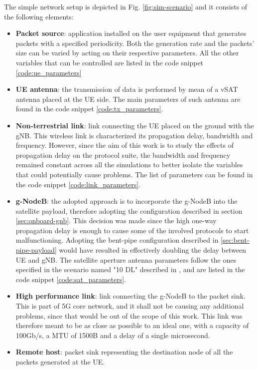 The simple network setup is depicted in Fig. \ref{fig:sim-scenario} and it consists of the following elements:
\begin{itemize}
    \item \textbf{Packet source}: application installed on the user equipment that generates packets with a specified periodicity. Both the generation rate and the packets' size can be varied by acting on their respective parameters. All the other variables that can be controlled are listed in the code snippet \ref{code:ue_parameters}
    \item \textbf{UE antenna}: the transmission of data is performed by mean of a \ac{vSAT} antenna placed at the \ac{UE} side. The main parameters of such antenna are found in the code snippet \ref{code:tx_parameters}.
    \item \textbf{Non-terrestrial link}: link connecting the \ac{UE} placed on the ground with the \ac{gNB}. This wireless link is characterized its propagation delay, bandwidth and frequency. However, since the aim of this work is to study the effects of propagation delay on the protocol suite, the bandwidth and frequency remained constant across all the simulations to better isolate the variables that could potentially cause problems. The list of parameters can be found in the code snippet \ref{code:link_parameters}.
    \item \textbf{g-NodeB}: the adopted approach is to incorporate the g-NodeB into the satellite payload, therefore adopting the configuration described in section \ref{sec:onboard-gnb}. This decision was made since the high one-way propagation delay is enough to cause some of the involved protocols to start malfunctioning. Adopting the bent-pipe configuration described in \ref{sec:bent-pipe-payload} would have resulted in effectively doubling the delay between \ac{UE} and \ac{gNB}. The satellite aperture antenna parameters follow the ones specified in the scenario named "10 DL" described in \cite{3gpp-tr-38.821}, and are listed in the code snippet \ref{code:sat_parameters}.
    \item \textbf{High performance link}: link connecting the g-NodeB to the packet sink. This is part of 5G core network, and it shall not be causing any additional problems, since that would be out of the scope of this work. This link was therefore meant to be as close as possible to an ideal one, with a capacity of 100Gb/s, a \ac{MTU} of 1500B and a delay of a single microsecond.
    \item \textbf{Remote host}: packet sink representing the destination node of all the packets generated at the \ac{UE}.
\end{itemize}



